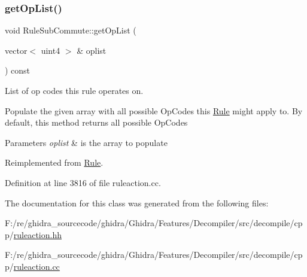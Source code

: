 \subsubsection{\texorpdfstring{getOpList()}{getOpList()}}
{\footnotesize\ttfamily void Rule\+Sub\+Commute\+::get\+Op\+List (\begin{DoxyParamCaption}\item[{vector$<$ uint4 $>$ \&}]{oplist }\end{DoxyParamCaption}) const\hspace{0.3cm}{\ttfamily [virtual]}}



List of op codes this rule operates on. 

Populate the given array with all possible Op\+Codes this \mbox{\hyperlink{class_rule}{Rule}} might apply to. By default, this method returns all possible Op\+Codes 
\begin{DoxyParams}{Parameters}
{\em oplist} & is the array to populate \\
\hline
\end{DoxyParams}


Reimplemented from \mbox{\hyperlink{class_rule_a4023bfc7825de0ab866790551856d10e}{Rule}}.



Definition at line 3816 of file ruleaction.\+cc.



The documentation for this class was generated from the following files\+:\begin{DoxyCompactItemize}
\item 
F\+:/re/ghidra\+\_\+sourcecode/ghidra/\+Ghidra/\+Features/\+Decompiler/src/decompile/cpp/\mbox{\hyperlink{ruleaction_8hh}{ruleaction.\+hh}}\item 
F\+:/re/ghidra\+\_\+sourcecode/ghidra/\+Ghidra/\+Features/\+Decompiler/src/decompile/cpp/\mbox{\hyperlink{ruleaction_8cc}{ruleaction.\+cc}}\end{DoxyCompactItemize}
